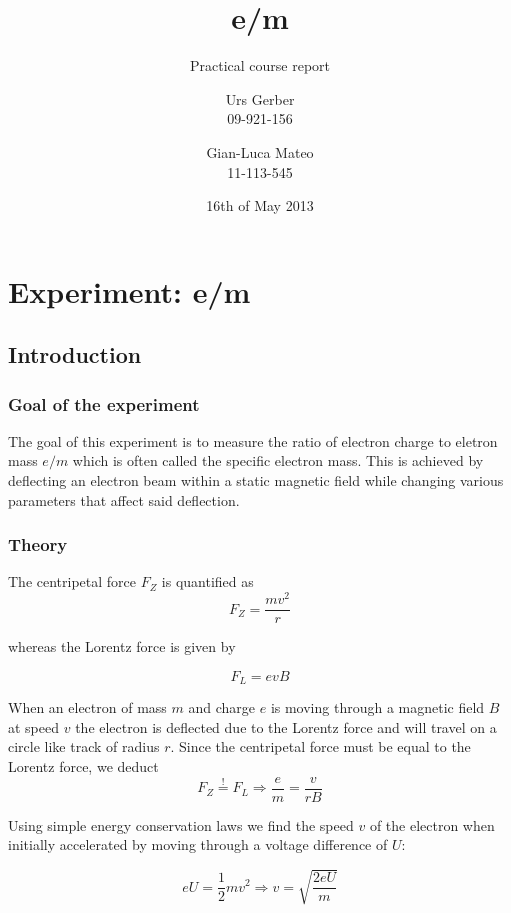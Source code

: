 \documentclass{scrreprt}
\author{Urs Gerber\\09-921-156 \and Gian-Luca Mateo\\11-113-545}
\date{16th of May 2013}
\title{e/m}
\subtitle{Practical course report}
\begin{document}
\maketitle

\tableofcontents
\newpage

\chapter{Experiment: e/m}
\section{Introduction}

\subsection{Goal of the experiment}
The goal of this experiment is to measure the ratio of electron charge to eletron mass $e/m$ which is often called the specific electron mass. This is achieved by deflecting an electron beam within a static magnetic field while changing various parameters that affect said deflection.

\subsection{Theory}
The centripetal force $F_Z$ is quantified as 
\begin{equation}
F_Z = \frac{m v^2}{r}
\end{equation}

whereas the Lorentz force is given by 

\begin{equation}
F_L = e v B
\end{equation}

When an electron of mass $m$ and charge $e$ is moving through a magnetic field $B$ at speed $v$ the electron is deflected due to the Lorentz force and will travel on a circle like track of radius $r$. Since the centripetal force must be equal to the Lorentz force, we deduct 
\begin{equation}
F_Z \stackrel{!}{=} F_L \Longrightarrow \frac{e}{m} = \frac{v}{r B}
\end{equation}

Using simple energy conservation laws we find the speed $v$ of the electron when initially accelerated by moving through a voltage difference of $U$:

\begin{equation}
e U = \frac{1}{2} m v^2 \Longrightarrow v = \sqrt{\frac{2 e U}{m}}
\end{equation}
\end{document}
